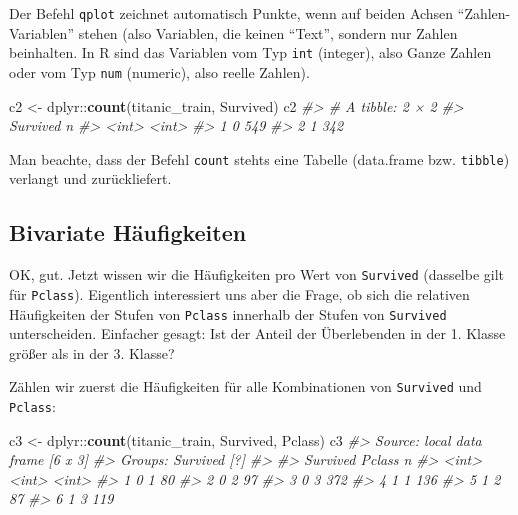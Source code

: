 \documentclass[12pt,]{book}
\newenvironment{Shaded}{\begin{snugshade}}{\end{snugshade}}
\newcommand{\KeywordTok}[1]{\textcolor[rgb]{0.13,0.29,0.53}{\textbf{{#1}}}}
\newcommand{\StringTok}[1]{\textcolor[rgb]{0.31,0.60,0.02}{{#1}}}
\newcommand{\CommentTok}[1]{\textcolor[rgb]{0.56,0.35,0.01}{\textit{{#1}}}}
\newcommand{\NormalTok}[1]{{#1}}
\begin{document}
Der Befehl \texttt{qplot} zeichnet automatisch Punkte, wenn auf beiden
Achsen ``Zahlen-Variablen'' stehen (also Variablen, die keinen ``Text'',
sondern nur Zahlen beinhalten. In R sind das Variablen vom Typ
\texttt{int} (integer), also Ganze Zahlen oder vom Typ \texttt{num}
(numeric), also reelle Zahlen).

\begin{Shaded}
\begin{Highlighting}[]

\NormalTok{c2 <-}\StringTok{ }\NormalTok{dplyr::}\KeywordTok{count}\NormalTok{(titanic_train, Survived)}
\NormalTok{c2}
\CommentTok{#> # A tibble: 2 × 2}
\CommentTok{#>   Survived     n}
\CommentTok{#>      <int> <int>}
\CommentTok{#> 1        0   549}
\CommentTok{#> 2        1   342}
\end{Highlighting}
\end{Shaded}

Man beachte, dass der Befehl \texttt{count} stehts eine Tabelle
(data.frame bzw. \texttt{tibble}) verlangt und zurückliefert.

\subsection{Bivariate Häufigkeiten}\label{bivariate-haufigkeiten}

OK, gut. Jetzt wissen wir die Häufigkeiten pro Wert von
\texttt{Survived} (dasselbe gilt für \texttt{Pclass}). Eigentlich
interessiert uns aber die Frage, ob sich die relativen Häufigkeiten der
Stufen von \texttt{Pclass} innerhalb der Stufen von \texttt{Survived}
unterscheiden. Einfacher gesagt: Ist der Anteil der Überlebenden in der
1. Klasse größer als in der 3. Klasse?

Zählen wir zuerst die Häufigkeiten für alle Kombinationen von
\texttt{Survived} und \texttt{Pclass}:

\begin{Shaded}
\begin{Highlighting}[]
\NormalTok{c3 <-}\StringTok{ }\NormalTok{dplyr::}\KeywordTok{count}\NormalTok{(titanic_train, Survived, Pclass)}
\NormalTok{c3}
\CommentTok{#> Source: local data frame [6 x 3]}
\CommentTok{#> Groups: Survived [?]}
\CommentTok{#> }
\CommentTok{#>   Survived Pclass     n}
\CommentTok{#>      <int>  <int> <int>}
\CommentTok{#> 1        0      1    80}
\CommentTok{#> 2        0      2    97}
\CommentTok{#> 3        0      3   372}
\CommentTok{#> 4        1      1   136}
\CommentTok{#> 5        1      2    87}
\CommentTok{#> 6        1      3   119}
\end{Highlighting}
\end{Shaded}
\end{document}
